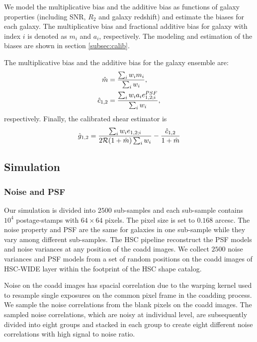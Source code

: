 We model the multiplicative bias and the additive bias as functions of galaxy
properties (including SNR, $R_2$ and galaxy redshift) and estimate the biases
for each galaxy. The multiplicative bias and fractional additive bias for
galaxy with index $i$ is denoted as $m_i$ and $a_i$, respectively. The modeling
and estimation of the biases are shown in section \ref{subsec:calib}.

The multiplicative bias and the additive bias for the galaxy ensemble are:
\begin{equation}
\begin{split}
    \hat{m}&=\frac{\sum_i w_i m_i}{\sum_i w_i},\\
    \hat{c}_{1,2}&=\frac{\sum_i w_i a_i e^{\rm{PSF}}_{1,2;i}}{\sum_i w_i},
\end{split}
\end{equation}
respectively.
Finally, the calibrated shear estimator is
\begin{equation}
    \hat{g}_{1,2}=\frac{\sum_i w_i e_{1,2;i}}{2\mathcal {R}(1+\hat{m})\sum_i w_i}
    -\frac{\hat{c}_{1,2}}{1+\hat{m}}
\end{equation}

\subsection{Simulation}
\label{subsec:Sim}

\subsubsection{Noise and PSF}

Our simulation is divided into $2500$ sub-samples and each sub-sample contains
$10^4$ postage-stamps with $64\times 64$ pixels. The pixel size is set to
$0.168$ arcesc. The noise property and PSF are the same for galaxies in one
sub-sample while they vary among different sub-samples. The HSC pipeline
reconstruct the PSF models and noise variances at any position of the coadd
images. We collect $2500$ noise variances and PSF models from a set of random
positions on the coadd images of HSC-WIDE layer within the footprint of the HSC
shape catalog.

Noise on the coadd images has spacial correlation due to the warping kernel
used to resample single exposures on the common pixel frame in the coadding
process. We sample the noise correlations from the blank pixels on the coadd
images. The sampled noise correlations, which are noisy at individual level,
are subsequently divided into eight groups and stacked in each group to create
eight different noise correlations with high signal to noise ratio.

